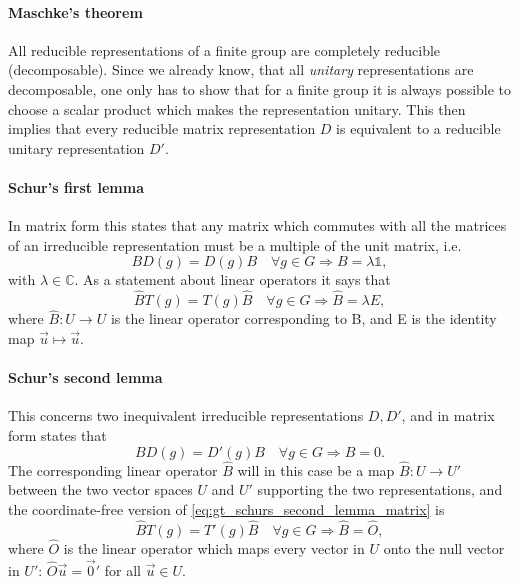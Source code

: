 \documentclass[../../main.tex]{subfiles}
\begin{document}
\paragraph{Maschke's theorem}
All reducible representations of a finite group are completely reducible (decomposable). Since we already know, that all \emph{unitary} representations are decomposable, one only has to show that for a finite group it is always possible to choose a scalar product which makes the representation unitary. This then implies that every reducible matrix representation $D$ is equivalent to a reducible unitary representation $D'$.

\paragraph{Schur's first lemma} \label{para:gt_schurs_first_lemma}
In matrix form this states that any matrix which commutes with all the matrices of an irreducible representation must be a multiple of the unit matrix, i.e.
\begin{equation}
    B D(g) = D(g) B \quad \forall g \in G \Rightarrow B = \lambda \mathds{1},
\end{equation}
with $\lambda \in \mathbb{C}$. As a statement about linear operators it says that 
\begin{equation}
    \hat B T(g) = T(g) \hat B \quad \forall g \in G \Rightarrow \hat B = \lambda E ,
\end{equation}
where $\hat B: U \rightarrow U$ is the linear operator corresponding to B, and E is the identity map $\vec u \mapsto \vec u$.

\paragraph{Schur's second lemma}
This concerns two inequivalent irreducible representations $D, D'$, and in matrix form states that
\begin{equation}
    B D(g) = D'(g)B \quad \forall g \in G \Rightarrow B = 0 . \label{eq:gt_schurs_second_lemma_matrix}
\end{equation} 
The corresponding linear operator $\hat B$ will in this case be a map $\hat B: U \rightarrow U'$ between the two vector spaces $U$ and $U'$ supporting the two representations, and the coordinate-free version of \cref{eq:gt_schurs_second_lemma_matrix} is
\begin{equation}
    \hat B T(g) = T'(g) \hat B \quad \forall g \in G \Rightarrow \hat B = \hat O ,
\end{equation}
where $\hat O$ is the linear operator which maps every vector in $U$ onto the null vector in $U'$: $\hat O \vec u = \vec 0'$ for all $ \vec u \in U$.
\end{document}

